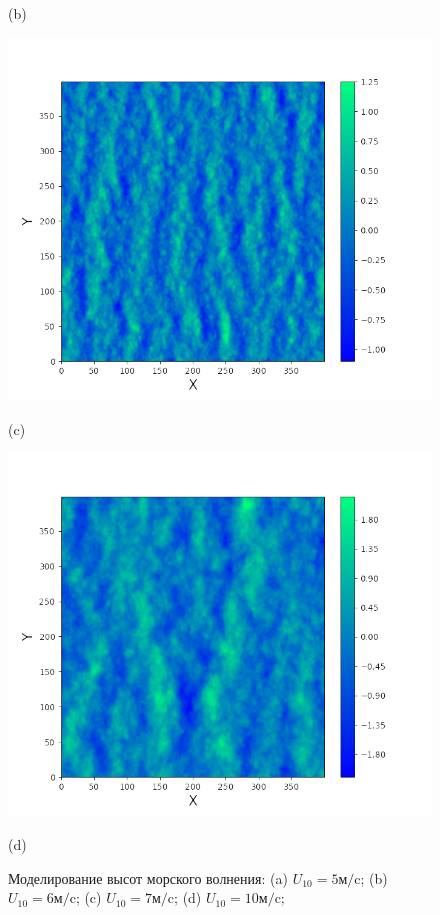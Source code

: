 \documentclass[a4paper,14pt]{extarticle}
\begin{document}
\begin{figure}[h!]
\begin{minipage}{0.49\linewidth}
        (b)
    \end{minipage}
    \begin{minipage}{0.49\linewidth}
        \centering
        \includegraphics[width=\linewidth]{img/water7}

        (c)
    \end{minipage}
    \begin{minipage}{0.49\linewidth}
        \centering
        \includegraphics[width=\linewidth]{img/water10}

        (d)
    \end{minipage}
    \caption{Моделирование высот морского волнения: 
        (a) $U_{10} = 5 \text{м}/\text{c}$;
        (b) $U_{10} = 6 \text{м}/\text{c}$;
        (c) $U_{10} = 7 \text{м}/\text{c}$;
        (d) $U_{10} = 10 \text{м}/\text{c}$;
}
    \label{fig:water}
\end{figure}
\end{document}
